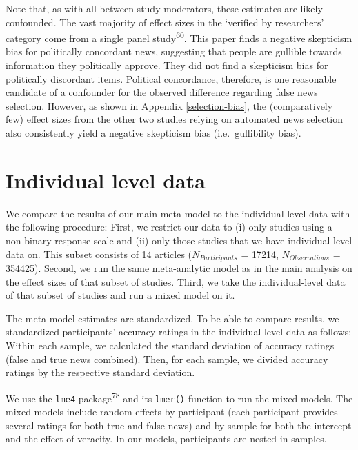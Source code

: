 \documentclass[
  doc,floatsintext]{apa6}
\begin{document}
Note that, as with all between-study moderators, these estimates are likely confounded. The vast majority of effect sizes in the `verified by researchers' category come from a single panel study\textsuperscript{60}. This paper finds a negative skepticism bias for politically concordant news, suggesting that people are gullible towards information they politically approve. They did not find a skepticism bias for politically discordant items. Political concordance, therefore, is one reasonable candidate of a confounder for the observed difference regarding false news selection. However, as shown in Appendix \ref{selection-bias}, the (comparatively few) effect sizes from the other two studies relying on automated news selection also consistently yield a negative skepticism bias (i.e.~gullibility bias).

\clearpage

\section{Individual level data}\label{individual-level}

\FloatBarrier

We compare the results of our main meta model to the individual-level data with the following procedure: First, we restrict our data to (i) only studies using a non-binary response scale and (ii) only those studies that we have individual-level data on. This subset consists of 14 articles (\(N_{Participants}\) = 17214, \(N_{Observations}\) = 354425). Second, we run the same meta-analytic model as in the main analysis on the effect sizes of that subset of studies. Third, we take the individual-level data of that subset of studies and run a mixed model on it.

The meta-model estimates are standardized. To be able to compare results, we standardized participants' accuracy ratings in the individual-level data as follows: Within each sample, we calculated the standard deviation of accuracy ratings (false and true news combined). Then, for each sample, we divided accuracy ratings by the respective standard deviation.

We use the \texttt{lme4} package\textsuperscript{78} and its \texttt{lmer()} function to run the mixed models. The mixed models include random effects by participant (each participant provides several ratings for both true and false news) and by sample for both the intercept and the effect of veracity. In our models, participants are nested in samples.
\end{document}
